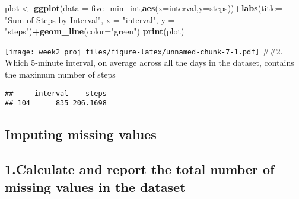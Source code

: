 \documentclass[]{article}
\newenvironment{Shaded}{\begin{snugshade}}{\end{snugshade}}
\newcommand{\KeywordTok}[1]{\textcolor[rgb]{0.13,0.29,0.53}{\textbf{#1}}}
\newcommand{\DataTypeTok}[1]{\textcolor[rgb]{0.13,0.29,0.53}{#1}}
\newcommand{\StringTok}[1]{\textcolor[rgb]{0.31,0.60,0.02}{#1}}
\newcommand{\OperatorTok}[1]{\textcolor[rgb]{0.81,0.36,0.00}{\textbf{#1}}}
\newcommand{\NormalTok}[1]{#1}
\begin{document}
\begin{Shaded}
\begin{Highlighting}[]
\NormalTok{plot <-}\StringTok{ }\KeywordTok{ggplot}\NormalTok{(}\DataTypeTok{data =}\NormalTok{ five_min_int,}\KeywordTok{aes}\NormalTok{(}\DataTypeTok{x=}\NormalTok{interval,}\DataTypeTok{y=}\NormalTok{steps))}\OperatorTok{+}\KeywordTok{labs}\NormalTok{(}\DataTypeTok{title=} \StringTok{"Sum of Steps by Interval"}\NormalTok{, }\DataTypeTok{x =} \StringTok{"interval"}\NormalTok{, }\DataTypeTok{y =} \StringTok{"steps"}\NormalTok{)}\OperatorTok{+}\KeywordTok{geom_line}\NormalTok{(}\DataTypeTok{color=}\StringTok{"green"}\NormalTok{)}
\KeywordTok{print}\NormalTok{(plot)}
\end{Highlighting}
\end{Shaded}

\texttt{[image: week2\_proj\_files/figure-latex/unnamed-chunk-7-1.pdf]}
\#\#2. Which 5-minute interval, on average across all the days in the
dataset, contains the maximum number of steps

\begin{Shaded}
\end{Shaded}

\begin{verbatim}
##     interval    steps
## 104      835 206.1698
\end{verbatim}

\subsection{Imputing missing values}\label{imputing-missing-values}

\subsection{1.Calculate and report the total number of missing values in
the
dataset}\label{calculate-and-report-the-total-number-of-missing-values-in-the-dataset}

\begin{Shaded}
\end{Shaded}
\end{document}
